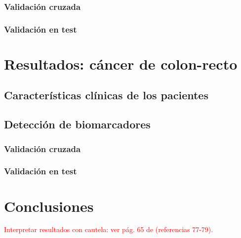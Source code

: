 \subsubsection{Validación cruzada}

\subsubsection{Validación en test}

\section{Resultados: cáncer de colon-recto}

\subsection{Características clínicas de los pacientes}

\subsection{Detección de biomarcadores}

\subsubsection{Validación cruzada}

\subsubsection{Validación en test}

\section{Conclusiones}

\textcolor{red}{Interpretar resultados con cautela: ver pág. 65 de \cite{CastilloSecilla2020} (referencias 77-79).}\\
